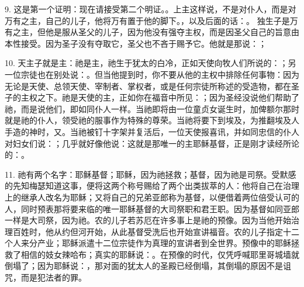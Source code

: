 9. 这是第一个证明：现在请接受第二个明证。。上主这样说，不是对仆人，而是对万有之主，自己的儿子，他将万有置于他的脚下。，以及后面的话：。 独生子是万有之主，但他是服从圣父的儿子，因为他没有强夺主权，而是因圣父自己的旨意由本性接受。因为圣子没有夺取它，圣父也不吝于赐予它。他就是那说：；\par

10. 天主子就是主：祂是主，祂生于犹太的白冷，正如天使向牧人们所说的：；另一位宗徒也在别处说：。但当他提到时，你不要从他的主权中排除任何事物：因为无论是天使、总领天使、宰制者、掌权者，或是任何宗徒所称述的受造物，都在圣子的主权之下。祂是天使的主，正如你在福音中所见：；因为圣经没说他们帮助了祂，而是说他们，即如同仆人一样。当祂即将由一位童贞女诞生时，加俾额尔那时就是祂的仆人，领受祂的服事作为特殊的尊荣。当祂将要下到埃及，为推翻埃及人手造的神时，又。当祂被钉十字架并复活后，一位天使报喜讯，并如同忠信的仆人对妇女们说：；几乎就好像他说：这就是那唯一的主耶稣基督，正是刚才读经所论的：。\par

11. 祂有两个名字：耶稣基督；耶稣，因为祂拯救；基督，因为祂是司祭。受默感的先知梅瑟知道这事，便将这两个称号赐给了两个出类拔萃的人：他将自己在治理上的继承人改名为耶稣；又将自己的兄弟亚郎称为基督，以便借着两位倍受认可的人，同时预表那将要来临的唯一耶稣基督的大司祭职和君王职。因为基督如同亚郎一样是大司祭，因为祂。农的儿子若苏厄在许多事上是祂的预像。因为当他开始治理百姓时，他从约但河开始，从此基督受洗后也开始宣讲福音。农的儿子指定十二个人来分产业；耶稣派遣十二位宗徒作为真理的宣讲者到全世界。预像中的耶稣拯救了相信的妓女辣哈布；真实的耶稣说：。在预像的时代，仅凭呼喊耶里哥城墙就倒塌了；因为耶稣说：，那对面的犹太人的圣殿已经倒塌，其倒塌的原因不是诅咒，而是犯法者的罪。\par

